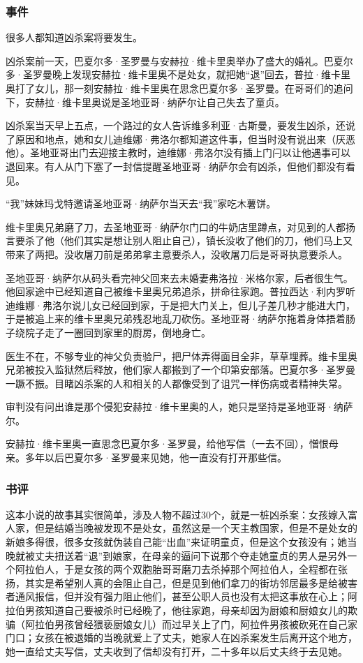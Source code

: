 \subsubsection{事件}
\begin{itemize*}
    \item 很多人都知道凶杀案将要发生。
    \item 凶杀案前一天，巴夏尔多·圣罗曼与安赫拉·维卡里奥举办了盛大的婚礼。巴夏尔多·圣罗曼晚上发现安赫拉·维卡里奥不是处女，就把她“退”回去，普拉·维卡里奥打了女儿，那一刻安赫拉·维卡里奥在思念巴夏尔多·圣罗曼。在哥哥们的追问下，安赫拉·维卡里奥说是圣地亚哥·纳萨尔让自己失去了童贞。
    \item 凶杀案当天早上五点，一个路过的女人告诉维多利亚·古斯曼，要发生凶杀，还说了原因和地点，她和女儿迪维娜·弗洛尔都知道这件事，但当时没有说出来（厌恶他）。圣地亚哥出门去迎接主教时，迪维娜·弗洛尔没有插上门闩以让他遇事可以退回来。有人从门下塞了一封信提醒圣地亚哥·纳萨尔会有凶杀，但他们都没有看见。
    \item “我”妹妹玛戈特邀请圣地亚哥·纳萨尔当天去“我”家吃木薯饼。
    \item 维卡里奥兄弟磨了刀，去圣地亚哥·纳萨尔门口的牛奶店里蹲点，对见到的人都扬言要杀了他（他们其实是想让别人阻止自己），镇长没收了他们的刀，他们马上又带来了两把。没收屠刀前是弟弟拿主意要杀人，没收屠刀后是哥哥执意要杀人。
    \item 圣地亚哥·纳萨尔从码头看完神父回来去未婚妻弗洛拉·米格尔家，后者很生气。他回家途中已经知道自己被维卡里奥兄弟追杀，拼命往家跑。普拉西达·利内罗听迪维娜·弗洛尔说儿女已经回到家，于是把大门关上，但儿子差几秒才能进大门，于是被追上来的维卡里奥兄弟残忍地乱刀砍伤。圣地亚哥·纳萨尔拖着身体捂着肠子绕院子走了一圈回到家里的厨房，倒地身亡。
    \item 医生不在，不够专业的神父负责验尸，把尸体弄得面目全非，草草埋葬。维卡里奥兄弟被投入监狱然后释放，他们家人都搬到了一个印第安部落。巴夏尔多·圣罗曼一蹶不振。目睹凶杀案的人和相关的人都像受到了诅咒一样伤病或者精神失常。
    \item 审判没有问出谁是那个侵犯安赫拉·维卡里奥的人，她只是坚持是圣地亚哥·纳萨尔。
    \item 安赫拉·维卡里奥一直思念巴夏尔多·圣罗曼，给他写信（一去不回），憎恨母亲。多年以后巴夏尔多·圣罗曼来见她，他一直没有打开那些信。
\end{itemize*}

\subsubsection{书评}
这本小说的故事其实很简单，涉及人物不超过30个，就是一桩凶杀案：女孩嫁入富人家，但是结婚当晚被发现不是处女，虽然这是一个天主教国家，但是不是处女的新娘多得很，很多女孩就伪装自己能“出血”来证明童贞，但是这个女孩没有；她当晚就被丈夫扭送着“退”到娘家，在母亲的逼问下说那个夺走她童贞的男人是另外一个阿拉伯人，于是女孩的两个双胞胎哥哥磨刀去杀掉那个阿拉伯人，全程都在张扬，其实是希望别人真的会阻止自己，但是见到他们拿刀的街坊邻居最多是给被害者通风报信，但并没有强力阻止他们，甚至公职人员也没有太把这事放在心上；阿拉伯男孩知道自己要被杀时已经晚了，他往家跑，母亲却因为厨娘和厨娘女儿的欺骗（阿拉伯男孩曾经猥亵厨娘女儿）而过早关上了门，阿拉件男孩被砍死在自己家门口；女孩在被退婚的当晚就爱上了丈夫，她家人在凶杀案发生后离开这个地方，她一直给丈夫写信，丈夫收到了信却没有打开，二十多年以后丈夫终于去见她。

